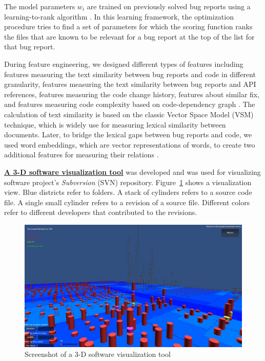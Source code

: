 The model parameters $w_i$ are trained on previously solved bug reports using a learning-to-rank algorithm \cite{Joachims:2006:TLS:1150402.1150429}. In this learning framework, the optimization procedure tries to find a set of parameters for which the scoring function ranks the files that are known to be relevant for a bug report at the top of the list for that bug report.

During feature engineering, we designed different types of features including features measuring the text similarity between bug reports and code in different granularity, features measuring the text similarity between bug reports and API references, features measuring the code change history, features about similar fix, and features measuring code complexity based on code-dependency graph \cite{Ye:TSE15}. The calculation of text similarity is based on the classic Vector Space Model (VSM) technique, which is widely use for measuring lexical similarity between documents. Later, to bridge the lexical gaps between bug reports and code, we used word embeddings, which are vector representations of words, to create two additional features for measuring their relations \cite{Ye:ICSE16}.

\textbf{\underline{A 3-D software visualization tool}} \cite{Ye:Access} was developed and was used for visualizing software project's \textit{Subversion} (SVN) repository. Figure~\ref{fig:teamwatch} shows a visualization view. Blue districts refer to folders. A stack of cylinders refers to a source code file. A single small cylinder refers to a revision of a source file. Different colors refer to different developers that contributed to the revisions.

\begin{figure}[t]
\centering
\includegraphics[width=\columnwidth]{figures/teamwatch.jpg}
\caption{Screenshot of a 3-D software visualization tool}%
\label{fig:teamwatch}
\end{figure}

